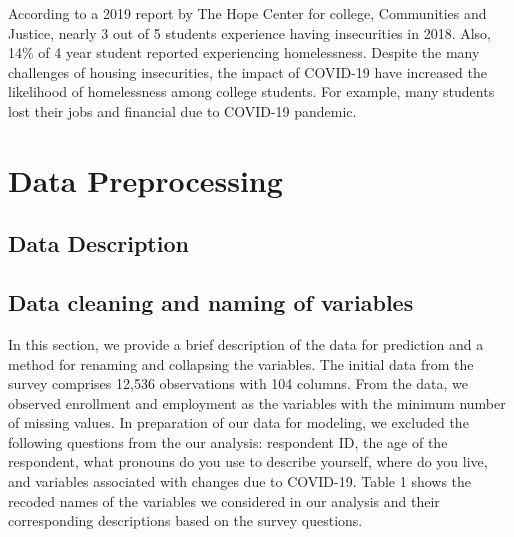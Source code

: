 \documentclass[
  10pt,
]{article}
\begin{document}
According to a 2019 report by The Hope Center for college, Communities and Justice, nearly 3 out of 5 students experience having insecurities in 2018. Also, 14\% of 4 year student reported experiencing homelessness. Despite the many challenges of housing insecurities, the impact of COVID-19 have increased the likelihood of homelessness among college students. For example, many students lost their jobs and financial due to COVID-19 pandemic.

\section{Data Preprocessing}

\subsection{Data Description}

\subsection{Data cleaning and naming of variables}

In this section, we provide a brief description of the data for prediction and a method for renaming and collapsing the variables. The initial data from the survey comprises 12,536 observations with 104 columns. From the data, we observed enrollment and employment as the variables with the minimum number of missing values. In preparation of our data for modeling, we excluded the following questions from the our analysis: respondent ID, the age of the respondent, what pronouns do you use to describe yourself, where do you live, and variables associated with changes due to COVID-19. Table 1 shows the recoded names of the variables we considered in our analysis and their corresponding descriptions based on the survey questions.
\end{document}
